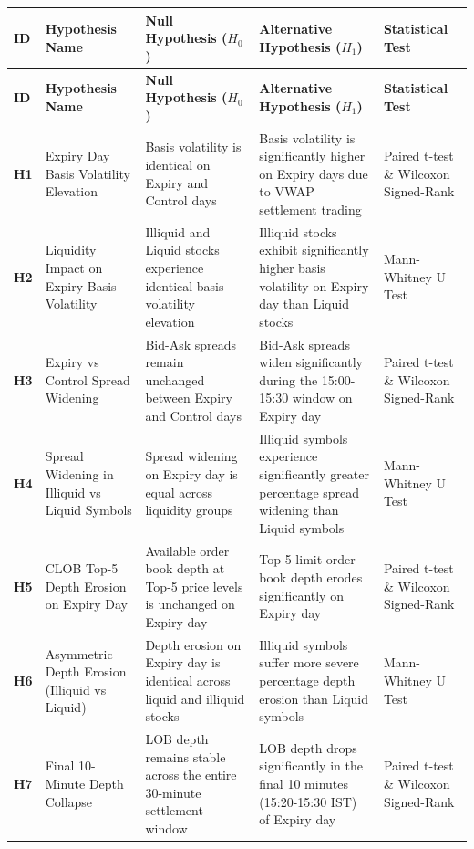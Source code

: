 \documentclass[11pt,a4paper]{article}
\begin{document}
\begin{longtable}{p{0.8cm} p{3.2cm} p{4.2cm} p{4.2cm} p{2.8cm}}
\toprule
\textbf{ID} & \textbf{Hypothesis Name} & \textbf{Null Hypothesis ($H_0$)} & \textbf{Alternative Hypothesis ($H_1$)} & \textbf{Statistical Test} \\
\midrule
\endfirsthead
\toprule
\textbf{ID} & \textbf{Hypothesis Name} & \textbf{Null Hypothesis ($H_0$)} & \textbf{Alternative Hypothesis ($H_1$)} & \textbf{Statistical Test} \\
\midrule
\endhead
\bottomrule
\endfoot
\bottomrule
\endlastfoot
\textbf{H1} & Expiry Day Basis Volatility Elevation & Basis volatility is identical on Expiry and Control days & Basis volatility is significantly higher on Expiry days due to VWAP settlement trading & Paired t-test \& Wilcoxon Signed-Rank \\
\addlinespace[3pt]
\textbf{H2} & Liquidity Impact on Expiry Basis Volatility & Illiquid and Liquid stocks experience identical basis volatility elevation & Illiquid stocks exhibit significantly higher basis volatility on Expiry day than Liquid stocks & Mann-Whitney U Test \\
\addlinespace[3pt]
\textbf{H3} & Expiry vs Control Spread Widening & Bid-Ask spreads remain unchanged between Expiry and Control days & Bid-Ask spreads widen significantly during the 15:00-15:30 window on Expiry day & Paired t-test \& Wilcoxon Signed-Rank \\
\addlinespace[3pt]
\textbf{H4} & Spread Widening in Illiquid vs Liquid Symbols & Spread widening on Expiry day is equal across liquidity groups & Illiquid symbols experience significantly greater percentage spread widening than Liquid symbols & Mann-Whitney U Test \\
\addlinespace[3pt]
\textbf{H5} & CLOB Top-5 Depth Erosion on Expiry Day & Available order book depth at Top-5 price levels is unchanged on Expiry day & Top-5 limit order book depth erodes significantly on Expiry day & Paired t-test \& Wilcoxon Signed-Rank \\
\addlinespace[3pt]
\textbf{H6} & Asymmetric Depth Erosion (Illiquid vs Liquid) & Depth erosion on Expiry day is identical across liquid and illiquid stocks & Illiquid symbols suffer more severe percentage depth erosion than Liquid symbols & Mann-Whitney U Test \\
\addlinespace[3pt]
\textbf{H7} & Final 10-Minute Depth Collapse & LOB depth remains stable across the entire 30-minute settlement window & LOB depth drops significantly in the final 10 minutes (15:20-15:30 IST) of Expiry day & Paired t-test \& Wilcoxon Signed-Rank \\

\end{longtable}
\end{document}
